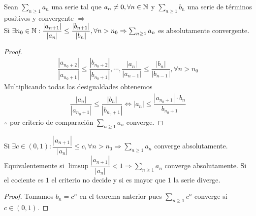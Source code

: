 \begin{theorem}
  Sean \(\sum_{n \geq 1} a_n\) una serie tal que \(a_n \neq 0, \forall n \in \mathbb{N}\) y \(\sum_{n \geq 1} b_n\) una serie de términos positivos y convergente \(\Rightarrow\) \\
  Si \(\exists n_0 \in \mathbb{N} : \dfrac{|a_{n+1}|}{|a_n|} \leq \dfrac{|b_{n+1}|}{|b_n|}, \forall n > n_0 \Rightarrow \sum_{n \geq 1} a_n\) es absolutamente convergente.

  \begin{proof}
    \begin{align*}
      \dfrac{|a_{n_0 + 2}|}{|a_{n_0 + 1}|} \leq \dfrac{|b_{n_0+2}|}{|b_{n_0+1}|}, \cdots, \dfrac{|a_n|}{|a_{n-1}|} \leq \dfrac{|b_n|}{|b_{n-1}|}, \forall n > n_0
    \end{align*}
    Multiplicando todas las desigualdades obtenemos
    \begin{align*}
      \dfrac{|a_n|}{|a_{n_0+1}|} \leq \dfrac{|b_n|}{|b_{n_0+1}|} \iff |a_n| \leq \dfrac{|a_{n_0+1}| \cdot b_n}{b_{n_0+1}}
    \end{align*}
    \(\therefore\) por criterio de comparación \(\sum_{n \geq 1} a_n\) converge.
  \end{proof}
\end{theorem}

\begin{corollary}
  Si \(\exists c \in (0, 1) : \dfrac{|a_{n+1}|}{|a_n|} \leq c, \forall n > n_0 \Rightarrow \sum_{n \geq 1} a_n\) converge absolutamente. \\
  Equivalentemente si \(\limsup \dfrac{|a_{n+1}|}{|a_n|} < 1 \Rightarrow \sum_{n \geq 1} a_n\) converge absolutamente.
  Si el cociente es \(1\) el criterio no decide y si es mayor que \(1\) la serie diverge.
  \begin{proof}
    Tomamos \(b_n = c^n\) en el teorema anterior pues \(\sum_{n \geq 1} c^n\) converge si \(c \in (0 ,1)\).
  \end{proof}
\end{corollary}

